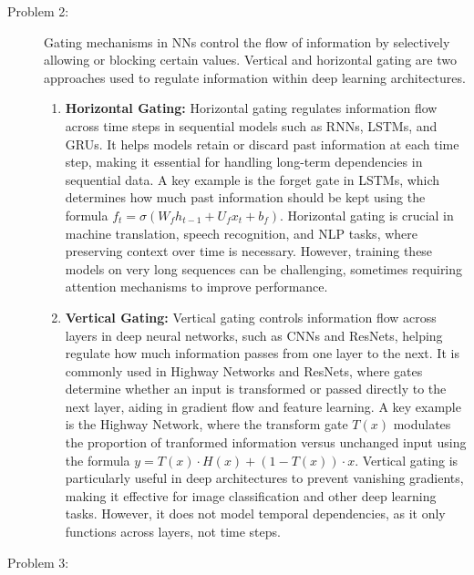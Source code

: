 \documentclass[10pt]{article}
\begin{document}
\begin{description}
\pagebreak

\item[Problem 2:]  \hfill %

Gating mechanisms in NNs control the flow of information by selectively allowing or blocking certain values. 
Vertical and horizontal gating are two approaches used to regulate information within deep learning architectures.

\begin{enumerate}
    \item \textbf{Horizontal Gating:} Horizontal gating regulates information flow across time steps in sequential models such as RNNs,
    LSTMs, and GRUs. It helps models retain or discard past information at each time step, making it essential for handling long-term dependencies in sequential data.
    A key example is the forget gate in LSTMs, which determines how much past information should be kept using the formula $f_t = \sigma(W_f h_{t-1} + U_f x_t + b_f)$.
    Horizontal gating is crucial in machine translation, speech recognition, and NLP tasks, where preserving context over time is necessary. 
    However, training these models on very long sequences can be challenging, sometimes requiring attention mechanisms to improve performance.

    \item \textbf{Vertical Gating:} Vertical gating controls information flow across layers in deep neural networks, such as CNNs and ResNets, 
    helping regulate how much information passes from one layer to the next. 
    It is commonly used in Highway Networks and ResNets, where gates determine whether an input is transformed or passed directly to the next layer,
    aiding in gradient flow and feature learning. A key example is the Highway Network, where the transform gate $T(x)$ modulates the proportion of tranformed information
    versus unchanged input using the formula $y = T(x) \cdot H(x) + (1 - T(x)) \cdot x$. Vertical gating is particularly useful in deep architectures to prevent vanishing 
    gradients, making it effective for image classification and other deep learning tasks. However, it does not model temporal dependencies, as it only functions across 
    layers, not time steps.
    
\end{enumerate}

\pagebreak

\item[Problem 3:]  \hfill %


\end{description}
\end{document}
